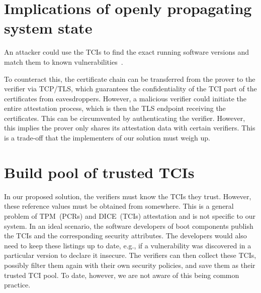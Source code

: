 


\section{Implications of openly propagating system state}

An attacker could use the TCIs to find the exact running software versions and match them to known vulnerabilities~\cite{rfc9334}.

To counteract this, the certificate chain can be transferred from the prover to the verifier via TCP/TLS, which guarantees the confidentiality of the TCI part of the certificates from eavesdroppers.
However, a malicious verifier could initiate the entire attestation process, which is then the TLS endpoint receiving the certificates.
This can be circumvented by authenticating the verifier.
However, this implies the prover only shares its attestation data with certain verifiers.
This is a trade-off that the implementers of our solution must weigh up.


\section{Build pool of trusted TCIs}

In our proposed solution, the verifiers must know the TCIs they trust.
However, these reference values must be obtained from somewhere.
This is a general problem of TPM~(PCRs) and DICE~(TCIs) attestation and is not specific to our system.
In an ideal scenario, the software developers of boot components publish the TCIs and the corresponding security attributes.
The developers would also need to keep these listings up to date, e.g., if a vulnerability was discovered in a particular version to declare it insecure.
The verifiers can then collect these TCIs, possibly filter them again with their own security policies, and save them as their trusted TCI pool.
To date, however, we are not aware of this being common practice.

